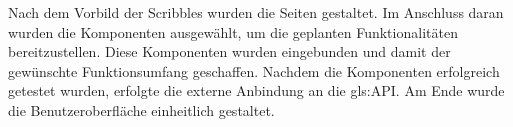 Nach dem Vorbild der Scribbles wurden die Seiten gestaltet. Im Anschluss daran wurden die Komponenten ausgewählt, um die geplanten Funktionalitäten bereitzustellen. Diese Komponenten wurden eingebunden und damit der gewünschte Funktionsumfang geschaffen. Nachdem die Komponenten erfolgreich getestet wurden, erfolgte die externe Anbindung an die \gls{gls:API}.
Am Ende wurde die Benutzeroberfläche einheitlich gestaltet.

